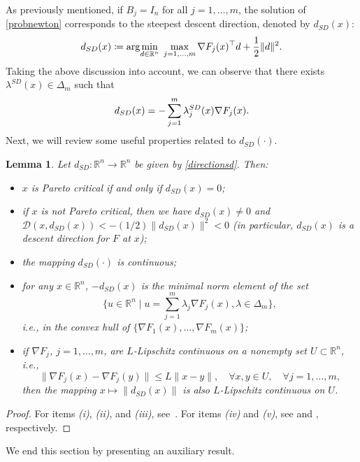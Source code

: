 \documentclass[11pt]{article}
\newtheorem{lemma}[theorem]{Lemma}
\numberwithin{assumption}{section}
\newcommand{\argmin}{{\rm arg}\!\min}
\newcommand{\R}{\mathbb{R}}
\newcommand{\D}{\mathcal{D}}
\newcommand{\dsd}{d_{SD}}
\newcommand{\ds}{\displaystyle}
\begin{document}
As previously mentioned, if $B_j=I_n$ for all $j=1,\ldots,m$, the solution of \eqref{probnewton} corresponds to the steepest descent direction, denoted by $\dsd(x)$:
 \begin{equation}{\label{directionsd}}
\dsd(x)\coloneqq\argmin_{d \in \R^n}\; \max_{j = 1,\dots,m }\nabla F_j (x)^\top d + \frac{1}{2}\|d\|^2.
\end{equation} 
Taking the above discussion into account, we can observe that there exists $\lambda^{SD}(x)\in\Delta_m$
such that
\begin{equation}{\label{dsd}}
\dsd(x) =- \ds\sum_{j=1}^{m} \lambda^{SD}_j(x)\nabla F_j (x).
\end{equation}
Next, we will review some useful properties related to $\dsd(\cdot)$.
\begin{lemma} \label{l:vtheta}
Let $d_{SD}:\R^n\to\R^n$ be given by \eqref{directionsd}. Then:
\begin{itemize}
\item[(i)] $x$ is Pareto critical if and only if $d_{SD}(x)=0$;
\item[(ii)] if $x$ is not Pareto critical, then we have $d_{SD}(x)\neq0$ and  $\D(x,d_{SD}(x))<-(1/2)\|d_{SD}(x)\|^2<0$ (in particular, $d_{SD}(x)$ is a descent direction for $F$ at $x$);
\item[(iii)] the mapping $d_{SD}(\cdot)$ is continuous;
\item[(iv)] for any $x\in\R^n$, $-d_{SD}(x)$ is the minimal norm element of the set 
$$\{u\in\R^n \mid u = \ds\sum_{j=1}^{m} \lambda_j\nabla F_j (x),\lambda\in\Delta_m \},$$
 i.e., in the convex hull of $\{\nabla F_1(x),\ldots,\nabla F_m(x)\}$;
 \item[(v)] if $\nabla F_j$, $j=1,\ldots,m$, are $L$-Lipschitz continuous on a nonempty set $U\subset \R^n$,  i.e.,
 $$\|\nabla F_j(x)-\nabla F_j(y)\|\leq L\|x-y\|, \quad \forall x,y\in U, \quad \forall j=1,\ldots,m,$$
 then the mapping $x\mapsto \|d_{SD}(x)\|$ is also $L$-Lipschitz continuous on $U$.
\end{itemize}
\end{lemma}
\begin{proof} 
For items {\it (i)}, {\it (ii)}, and {\it (iii)}, see~\cite[Lemma~3.3]{mauricio&benar}. For items {\it (iv)} and {\it (v)}, see \cite[Corollary~2.3]{Sbenar} and \cite[Theorem~3.1]{Sbenar}, respectively.
\end{proof}

We end this section by presenting an auxiliary result.
\end{document}
